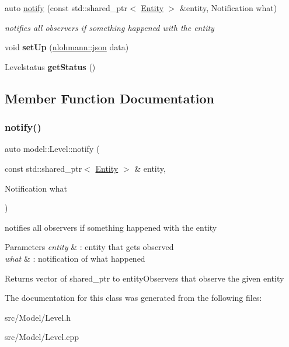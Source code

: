 \begin{DoxyCompactItemize}
\item 
auto \mbox{\hyperlink{classmodel_1_1_level_a2839ea78a98b86653730e2bb1759efbc}{notify}} (const std\+::shared\+\_\+ptr$<$ \mbox{\hyperlink{classmodel_1_1_entity}{Entity}} $>$ \&entity, Notification what)
\begin{DoxyCompactList}\small\item\em notifies all observers if something happened with the entity \end{DoxyCompactList}\item 
\mbox{\label{classmodel_1_1_level_a230b4090b85ad3ae56d78c533cd0c20d}} 
void {\bfseries set\+Up} (\mbox{\hyperlink{namespacenlohmann_a2bfd99e845a2e5cd90aeaf1b1431f474}{nlohmann\+::json}} data)
\item 
\mbox{\label{classmodel_1_1_level_a35644e5bdb31bfb9332615538cfe7ea4}} 
Levelstatus {\bfseries get\+Status} ()
\end{DoxyCompactItemize}


\subsection{Member Function Documentation}
\mbox{\label{classmodel_1_1_level_a2839ea78a98b86653730e2bb1759efbc}} 
\subsubsection{\texorpdfstring{notify()}{notify()}}
{\footnotesize\ttfamily auto model\+::\+Level\+::notify (\begin{DoxyParamCaption}\item[{const std\+::shared\+\_\+ptr$<$ \mbox{\hyperlink{classmodel_1_1_entity}{Entity}} $>$ \&}]{entity,  }\item[{Notification}]{what }\end{DoxyParamCaption})}



notifies all observers if something happened with the entity 


\begin{DoxyParams}{Parameters}
{\em entity} & \+: entity that gets observed \\
\hline
{\em what} & \+: notification of what happened \\
\hline
\end{DoxyParams}
\begin{DoxyReturn}{Returns}
vector of shared\+\_\+ptr to entity\+Observers that observe the given entity 
\end{DoxyReturn}


The documentation for this class was generated from the following files\+:\begin{DoxyCompactItemize}
\item 
src/\+Model/Level.\+h\item 
src/\+Model/Level.\+cpp\end{DoxyCompactItemize}
